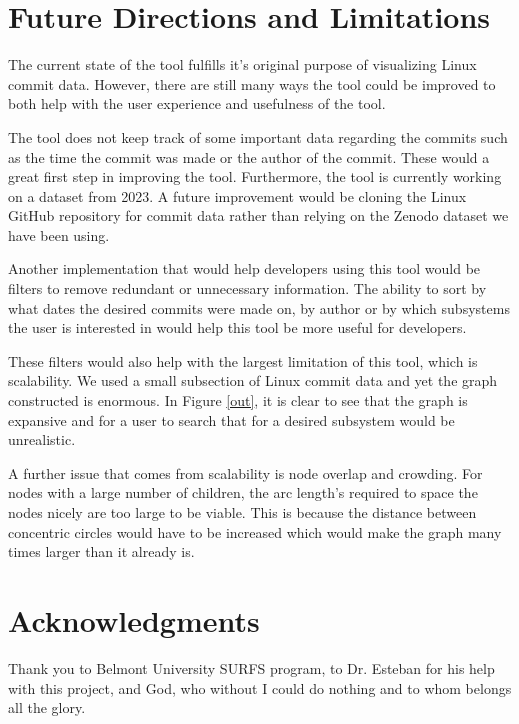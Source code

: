 \documentclass[conference]{IEEEtran}
\begin{document}
\section{Future Directions and Limitations}
\label{futDir}

The current state of the tool fulfills it's original purpose of visualizing Linux commit data. However, there are still many ways the tool could be improved to both help with the user experience and usefulness of the tool.

The tool does not keep track of some important data regarding the commits such as the time the commit was made or the author of the commit. These would a great first step in improving the tool. Furthermore, the tool is currently working on a dataset from 2023. A future improvement would be cloning the Linux GitHub repository for commit data rather than relying on the Zenodo dataset \cite{zenodo} we have been using.

Another implementation that would help developers using this tool would be filters to remove redundant or unnecessary information. The ability to sort by what dates the desired commits were made on, by author or by which subsystems the user is interested in would help this tool be more useful for developers. 

These filters would also help with the largest limitation of this tool, which is scalability. We used a small subsection of Linux commit data and yet the graph constructed is enormous. In Figure \ref{out}, it is clear to see that the graph is expansive and for a user to search that for a desired subsystem would be unrealistic. 

A further issue that comes from scalability is node overlap and crowding. For nodes with a large number of children, the arc length's required to space the nodes nicely are too large to be viable. This is because the distance between concentric circles would have to be increased which would make the graph many times larger than it already is.




\section*{Acknowledgments}
Thank you to Belmont University SURFS program, to Dr. Esteban for his help with this project, and God, who without I could do nothing and to whom belongs all the glory.







\vspace{12pt}
\end{document}
